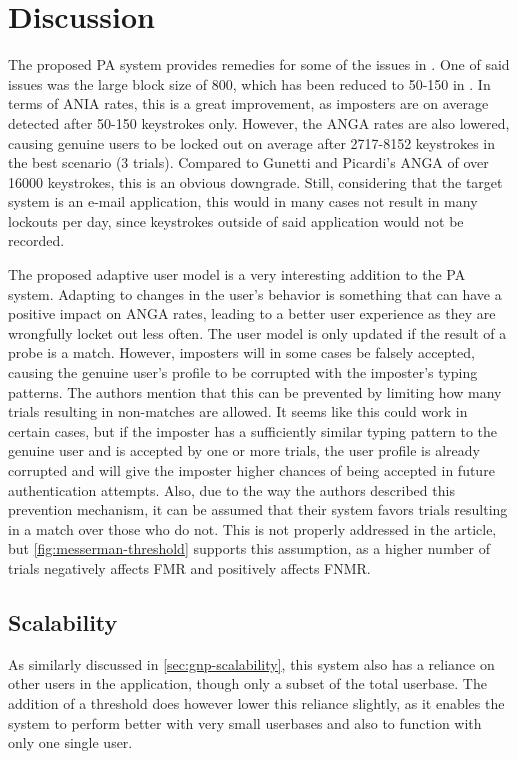 \documentclass[informationsecurity]{gucmasterproject}
\begin{document}
\section{Discussion}
The proposed PA system provides remedies for some of the issues in \cite{gnp}.
One of said issues was the large block size of 800, which has been reduced to 50-150 in \cite{Messerman}.
In terms of ANIA rates, this is a great improvement, as imposters are on average detected after 50-150 keystrokes only.
However, the ANGA rates are also lowered, causing genuine users to be locked out on average after 2717-8152 keystrokes in the best scenario (3 trials).
Compared to Gunetti and Picardi's ANGA of over 16000 keystrokes, this is an obvious downgrade.
Still, considering that the target system is an e-mail application, this would in many cases not result in many lockouts per day, since keystrokes outside of said application would not be recorded.

The proposed adaptive user model is a very interesting addition to the PA system.
Adapting to changes in the user's behavior is something that can have a positive impact on ANGA rates, leading to a better user experience as they are wrongfully locket out less often.
The user model is only updated if the result of a probe is a match.
However, imposters will in some cases be falsely accepted, causing the genuine user's profile to be corrupted with the imposter's typing patterns.
The authors mention that this can be prevented by limiting how many trials resulting in non-matches are allowed.
It seems like this could work in certain cases, but if the imposter has a sufficiently similar typing pattern to the genuine user and is accepted by one or more trials, the user profile is already corrupted and will give the imposter higher chances of being accepted in future authentication attempts.
Also, due to the way the authors described this prevention mechanism, it can be assumed that their system favors trials resulting in a match over those who do not.
This is not properly addressed in the article, but \cref{fig:messerman-threshold} supports this assumption, as a higher number of trials negatively affects FMR and positively affects FNMR.

\subsection{Scalability}
As similarly discussed in \cref{sec:gnp-scalability}, this system also has a reliance on other users in the application, though only a subset of the total userbase.
The addition of a threshold does however lower this reliance slightly, as it enables the system to perform better with very small userbases and also to function with only one single user.
\end{document}
